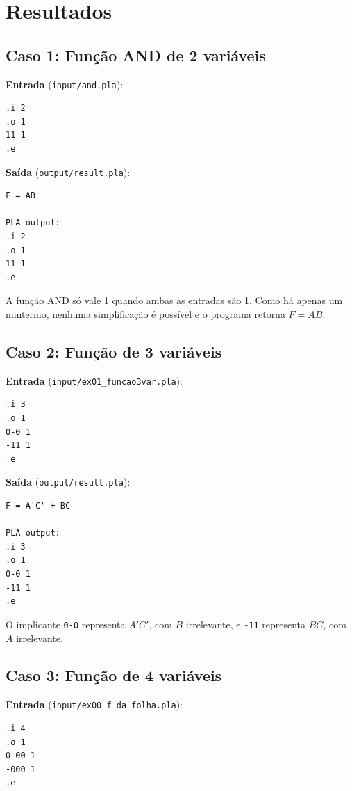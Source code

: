 \documentclass[conference]{IEEEtran}
\begin{document}
\section{Resultados}

\subsection{Caso 1: Função AND de 2 variáveis}

\noindent\textbf{Entrada} (\texttt{input/and.pla}):
\begin{lstlisting}[style=pla]
.i 2
.o 1
11 1
.e
\end{lstlisting}

\noindent\textbf{Saída} (\texttt{output/result.pla}):
\begin{lstlisting}[style=pla]
F = AB

PLA output:
.i 2
.o 1
11 1
.e
\end{lstlisting}

A função AND só vale 1 quando ambas as entradas são 1. Como há apenas um
mintermo, nenhuma simplificação é possível e o programa retorna $F = AB$.

\subsection{Caso 2: Função de 3 variáveis}

\noindent\textbf{Entrada} (\texttt{input/ex01\_funcao3var.pla}):
\begin{lstlisting}[style=pla]
.i 3
.o 1
0-0 1
-11 1
.e
\end{lstlisting}

\noindent\textbf{Saída} (\texttt{output/result.pla}):
\begin{lstlisting}[style=pla]
F = A'C' + BC

PLA output:
.i 3
.o 1
0-0 1
-11 1
.e
\end{lstlisting}

O implicante \texttt{0-0} representa $A'C'$, com $B$ irrelevante, e
\texttt{-11} representa $BC$, com $A$ irrelevante.

\subsection{Caso 3: Função de 4 variáveis}

\noindent\textbf{Entrada} (\texttt{input/ex00\_f\_da\_folha.pla}):
\begin{lstlisting}[style=pla]
.i 4
.o 1
0-00 1
-000 1
.e
\end{lstlisting}
\end{document}
